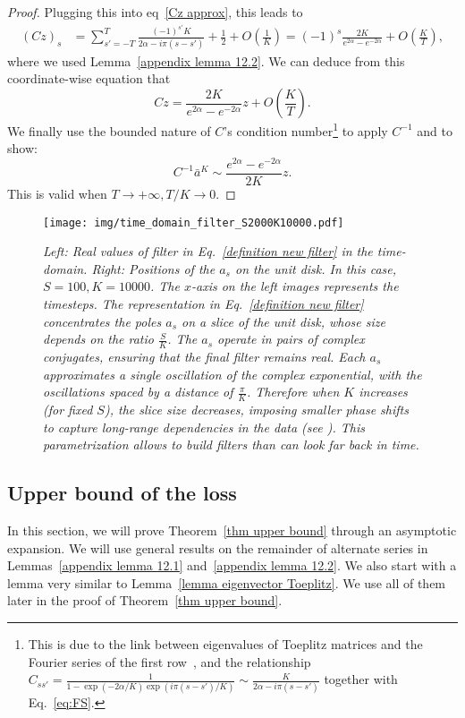 \begin{proof}
Plugging this into eq~\eqref{Cz approx}, this leads to
 \begin{align*}
    (Cz)_s &=\sum_{s'=-T}^T\frac{(-1)^{s'}K}{2\alpha - i\pi(s-s')}  + \frac{1}{2} + O(\frac{1}{K}) =(-1)^s\frac{2K}{e^{2\alpha}-e^{-2\alpha}} + O(\frac{K}{T}),
 \end{align*}   
where we used Lemma~\ref{appendix lemma 12.2}.
We can deduce from this coordinate-wise equation that 
\[
Cz = \frac{2K}{e^{2\alpha}-e^{-2\alpha}}z + O(\frac{K}{T}).
\]
We finally use the bounded nature of $C$'s condition number\footnote{This is due to the link between eigenvalues of Toeplitz matrices and the Fourier series of the first row~\cite{gray2006toeplitz}, and the relationship $C_{ss'} = \frac{1}{1-\exp(-2\alpha/K) \exp( i \pi (s-s')/K)}
\sim \frac{K}{2 \alpha - i\pi ( s-s')}$ together with Eq.~\eqref{eq:FS}.} to apply $C^{-1}$ and to show:
\[ \displaystyle
C^{-1}\bar{a}^K \sim \frac{e^{2\alpha} - e^{-2\alpha}}{2K}z.
\]
This is valid when $T\rightarrow+\infty, T/K\rightarrow 0$.
\end{proof}


\begin{figure}[ht]
    \centering
    \texttt{[image: img/time\_domain\_filter\_S2000K10000.pdf]}
    \caption{\textit{Left: Real values of filter in Eq.~\eqref{definition new filter} in the time-domain. Right: Positions of the $a_s$ on the unit disk. In this case, $S=100, K=10000$. The $x$-axis on the left images represents the timesteps. The representation in Eq.~\eqref{definition new filter} concentrates the poles $a_s$ on a slice of the unit disk, whose size depends on the ratio $\frac{S}{K}$. The $a_s$ operate in pairs of complex conjugates, ensuring that the final filter remains real. Each $a_s$ approximates a single oscillation of the complex exponential, with the oscillations spaced by a distance of $\frac{\pi}{K}$. Therefore when $K$ increases (for fixed $S$), the slice size decreases, imposing smaller phase shifts to capture long-range dependencies in the data (see \cite{orvieto2023resurrecting}). This parametrization allows to build filters than can look far back in time.}}
    \label{fig:time domain filter}
\end{figure}

\subsection{Upper bound of the loss}

In this section, we will prove Theorem~\ref{thm upper bound} through an asymptotic expansion. We will use general results on the remainder of alternate series in Lemmas~\ref{appendix lemma 12.1} and~\ref{appendix lemma 12.2}. We also start with a lemma very similar to Lemma~\ref{lemma eigenvector Toeplitz}. We use all of them later in the proof of Theorem~\ref{thm upper bound}.



